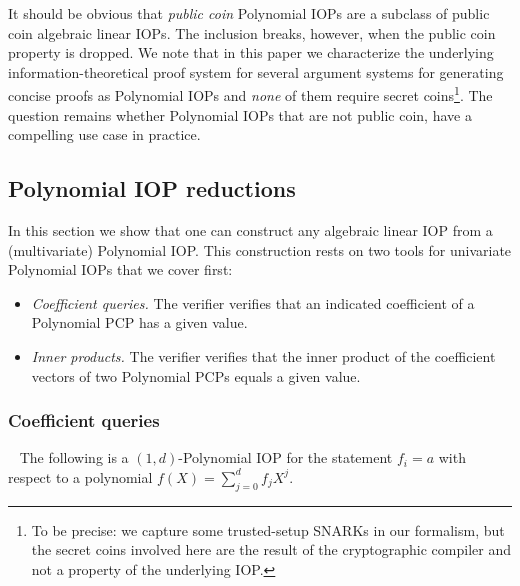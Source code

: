 It should be obvious that \emph{public coin} Polynomial IOPs are a subclass of public coin algebraic linear IOPs. The inclusion breaks, however, when the public coin property is dropped. We note that in this paper we characterize the underlying information-theoretical proof system for several argument systems for generating concise proofs as Polynomial IOPs and \emph{none} of them require secret coins\footnote{To be precise: we capture some trusted-setup SNARKs in our formalism, but the secret coins involved here are the result of the cryptographic compiler and not a property of the underlying IOP.}. The question remains whether Polynomial IOPs that are not public coin, have a compelling use case in practice.

\subsection{Polynomial IOP reductions} 

In this section we show that one can construct any algebraic linear IOP from a (multivariate) Polynomial IOP. This construction rests on two tools for univariate Polynomial IOPs that we cover first:
\begin{itemize}
    \item \emph{Coefficient queries.} The verifier verifies that an indicated coefficient of a Polynomial PCP has a given value.
    \item \emph{Inner products.} The verifier verifies that the inner product of the coefficient vectors of two Polynomial PCPs equals a given value.
\end{itemize}

\subsubsection{Coefficient queries}~\label{sec:opencoefficient} 
The following is a $(1, d)$-Polynomial IOP for the statement $f_i = a$ with respect to a polynomial $f(X) = \sum_{j=0}^d f_j X^j$. %

